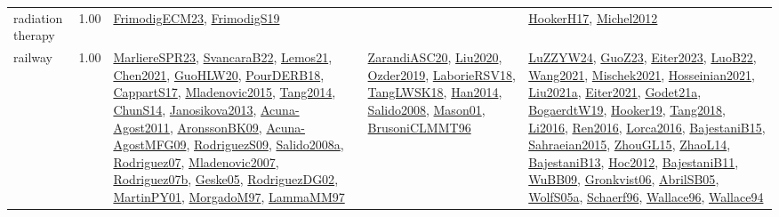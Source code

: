 {\begin{longtable}{p{3cm}r>{\raggedright\arraybackslash}p{6cm}>{\raggedright\arraybackslash}p{6cm}>{\raggedright\arraybackslash}p{8cm}}
\index{radiation therapy}\index{ApplicationAreas!radiation therapy}radiation therapy &  1.00 & \hyperref[detail:FrimodigECM23]{FrimodigECM23}, \hyperref[detail:FrimodigS19]{FrimodigS19} &  & \hyperref[detail:HookerH17]{HookerH17}, \hyperref[detail:Michel2012]{Michel2012}\\
\index{railway}\index{ApplicationAreas!railway}railway &  1.00 & \hyperref[detail:MarliereSPR23]{MarliereSPR23}, \hyperref[detail:SvancaraB22]{SvancaraB22}, \hyperref[detail:Lemos21]{Lemos21}, \hyperref[detail:Chen2021]{Chen2021}, \hyperref[detail:GuoHLW20]{GuoHLW20}, \hyperref[detail:PourDERB18]{PourDERB18}, \hyperref[detail:CappartS17]{CappartS17}, \hyperref[detail:Mladenovic2015]{Mladenovic2015}, \hyperref[detail:Tang2014]{Tang2014}, \hyperref[detail:ChunS14]{ChunS14}, \hyperref[detail:Janosikova2013]{Janosikova2013}, \hyperref[detail:Acuna-Agost2011]{Acuna-Agost2011}, \hyperref[detail:AronssonBK09]{AronssonBK09}, \hyperref[detail:Acuna-AgostMFG09]{Acuna-AgostMFG09}, \hyperref[detail:RodriguezS09]{RodriguezS09}, \hyperref[detail:Salido2008a]{Salido2008a}, \hyperref[detail:Rodriguez07]{Rodriguez07}, \hyperref[detail:Mladenovic2007]{Mladenovic2007}, \hyperref[detail:Rodriguez07b]{Rodriguez07b}, \hyperref[detail:Geske05]{Geske05}, \hyperref[detail:RodriguezDG02]{RodriguezDG02}, \hyperref[detail:MartinPY01]{MartinPY01}, \hyperref[detail:MorgadoM97]{MorgadoM97}, \hyperref[detail:LammaMM97]{LammaMM97} & \hyperref[detail:ZarandiASC20]{ZarandiASC20}, \hyperref[detail:Liu2020]{Liu2020}, \hyperref[detail:Ozder2019]{Ozder2019}, \hyperref[detail:LaborieRSV18]{LaborieRSV18}, \hyperref[detail:TangLWSK18]{TangLWSK18}, \hyperref[detail:Han2014]{Han2014}, \hyperref[detail:Salido2008]{Salido2008}, \hyperref[detail:Mason01]{Mason01}, \hyperref[detail:BrusoniCLMMT96]{BrusoniCLMMT96} & \hyperref[detail:LuZZYW24]{LuZZYW24}, \hyperref[detail:GuoZ23]{GuoZ23}, \hyperref[detail:Eiter2023]{Eiter2023}, \hyperref[detail:LuoB22]{LuoB22}, \hyperref[detail:Wang2021]{Wang2021}, \hyperref[detail:Mischek2021]{Mischek2021}, \hyperref[detail:Hosseinian2021]{Hosseinian2021}, \hyperref[detail:Liu2021a]{Liu2021a}, \hyperref[detail:Eiter2021]{Eiter2021}, \hyperref[detail:Godet21a]{Godet21a}, \hyperref[detail:BogaerdtW19]{BogaerdtW19}, \hyperref[detail:Hooker19]{Hooker19}, \hyperref[detail:Tang2018]{Tang2018}, \hyperref[detail:Li2016]{Li2016}, \hyperref[detail:Ren2016]{Ren2016}, \hyperref[detail:Lorca2016]{Lorca2016}, \hyperref[detail:BajestaniB15]{BajestaniB15}, \hyperref[detail:Sahraeian2015]{Sahraeian2015}, \hyperref[detail:ZhouGL15]{ZhouGL15}, \hyperref[detail:ZhaoL14]{ZhaoL14}, \hyperref[detail:BajestaniB13]{BajestaniB13}, \hyperref[detail:Hoc2012]{Hoc2012}, \hyperref[detail:BajestaniB11]{BajestaniB11}, \hyperref[detail:WuBB09]{WuBB09}, \hyperref[detail:Gronkvist06]{Gronkvist06}, \hyperref[detail:AbrilSB05]{AbrilSB05}, \hyperref[detail:WolfS05a]{WolfS05a}, \hyperref[detail:Schaerf96]{Schaerf96}, \hyperref[detail:Wallace96]{Wallace96}, \hyperref[detail:Wallace94]{Wallace94}\\

\end{longtable}}
